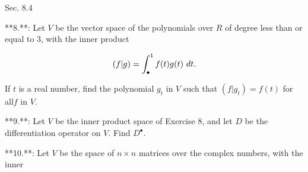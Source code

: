 Sec. 8.4

**8.**: Let \(V\) be the vector space of the polynomials over \(R\) of degree less than or equal to 3, with the inner product

\[(f|g)=\int_{\mbox{\scriptsize$\bullet$}}^{1}f(t)g(t)\ dt.\]

If \(t\) is a real number, find the polynomial \(g_{t}\) in \(V\) such that \((f|g_{t})=f(t)\) for all\(f\) in \(V\).

**9.**: Let \(V\) be the inner product space of Exercise 8, and let \(D\) be the differentiation operator on \(V\). Find \(D^{\bullet}\).

**10.**: Let \(V\) be the space of \(n\times n\) matrices over the complex numbers, with the inner 